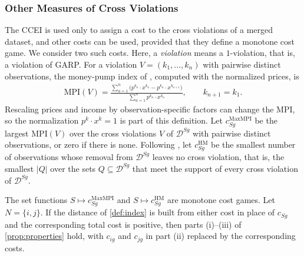 \documentclass[11 pt]{article}
\begin{document}
\subsubsection{Other Measures of Cross Violations}\label{subsec:app_othermeasures}

The CCEI is used only to assign a cost to the cross violations of a merged dataset, and other costs can be used, provided that they define a monotone cost game. We consider two such costs. Here, a \emph{violation} means a $1$-violation, that is, a violation of GARP. For a violation $V = (k_1, \dots, k_n)$ with pairwise distinct observations, the money-pump index of \citet{echenique2011money}, computed with the normalized prices, is
\begin{align*}
\mathrm{MPI}(V) = \frac{\sum_{a=1}^{n} \bigl( p^{k_a} \cdot x^{k_a} - p^{k_a} \cdot x^{k_{a+1}} \bigr)}{\sum_{a=1}^{n} p^{k_a} \cdot x^{k_a}}, \qquad k_{n+1} = k_1.
\end{align*}
Rescaling prices and income by observation-specific factors can change the MPI, so the normalization $p^{k} \cdot x^{k} = 1$ is part of this definition. Let $c^{\mathrm{MaxMPI}}_{Sg}$ be the largest $\mathrm{MPI}(V)$ over the cross violations $V$ of $\mathcal{D}^{Sg}$ with pairwise distinct observations, or zero if there is none. Following \citet{houtman1985determining}, let $c^{\mathrm{HM}}_{Sg}$ be the smallest number of observations whose removal from $\mathcal{D}^{Sg}$ leaves no cross violation, that is, the smallest $|Q|$ over the sets $Q \subseteq \mathcal{D}^{Sg}$ that meet the support of every cross violation of $\mathcal{D}^{Sg}$.

\begin{proposition}\label{prop:app_othermeasures}
The set functions $S \mapsto c^{\mathrm{MaxMPI}}_{Sg}$ and $S \mapsto c^{\mathrm{HM}}_{Sg}$ are monotone cost games. Let $N = \{i,j\}$. If the distance of \autoref{def:index} is built from either cost in place of $c_{Sg}$ and the corresponding total cost is positive, then parts (i)--(iii) of \autoref{prop:properties} hold, with $c_{ig}$ and $c_{jg}$ in part (ii) replaced by the corresponding costs.
\end{proposition}
\end{document}
